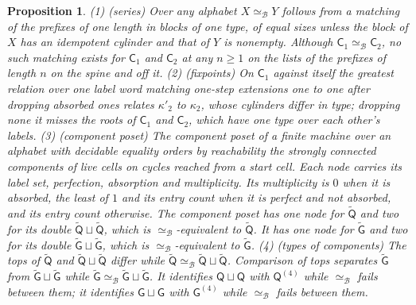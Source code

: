 \documentclass{lmcs}
\newtheorem{proposition}[theorem]{Proposition}
\theoremstyle{definition}
\theoremstyle{remark}
\providecommand{\dsum}{\sqcup}
\providecommand{\wQ}{\mathsf{Q}}
\providecommand{\eqB}{\simeq_{\mathcal{B}}}
\providecommand{\dsum}{\sqcup}
\providecommand{\wG}{\mathsf{G}}
\providecommand{\wGt}{\tilde{\mathsf{G}}}
\providecommand{\wQ}{\mathsf{Q}}
\providecommand{\wQt}{\tilde{\mathsf{Q}}}
\providecommand{\wC}[1]{\mathsf{C}_{#1}}
\begin{document}
\begin{proposition}\label{prop:presentations}
(1) (\emph{series}) Over any alphabet $X\eqB Y$ follows from a matching of the prefixes of one length in blocks of one
type, of equal sizes unless the block of $X$ has an idempotent cylinder and that of $Y$ is
nonempty. Although $\wC{1}\eqB\wC{2}$, no such matching exists for $\wC{1}$ and $\wC{2}$ at
any $n\geq1$ on the lists of the prefixes of length $n$ on the spine and off it.
(2) (\emph{fixpoints}) On $\wC{1}$ against itself the greatest relation over one label word matching one-step extensions one to one
after dropping absorbed ones relates $\kappa'_2$ to $\kappa_2$, whose cylinders differ in type;
dropping none it misses the roots of $\wC{1}$ and $\wC{2}$, which have one type over
each other's labels.
(3) (\emph{component poset}) The \emph{component poset} of a finite machine over an alphabet with decidable equality
orders by reachability the strongly connected components of live cells on cycles reached from a start
cell. Each node carries its label set, perfection, absorption and
multiplicity. Its multiplicity is $0$ when it is absorbed, the least of $1$ and its entry
count when it is perfect and not absorbed, and its entry count otherwise. The component poset
has one node for $\wQt$ and two for its double $\wQt\dsum\wQt$, which
is $\eqB$-equivalent to $\wQt$. It has one node for $\wGt$ and two for its double
$\wGt\dsum\wGt$, which is $\eqB$-equivalent to $\wGt$.
(4) (\emph{types of components}) The tops of $\wQt$ and $\wQt\dsum\wQt$ differ while
$\wQt\eqB\wQt\dsum\wQt$. Comparison of tops separates $\wGt$ from $\wGt\dsum\wGt$ while $\wGt\eqB\wGt\dsum\wGt$. It identifies
$\wQ\dsum\wQ$ with $\wQ^{(4)}$ while $\eqB$ fails between them; it identifies
$\wG\dsum\wG$ with $\wG^{(4)}$ while $\eqB$ fails between them.
\end{proposition}
\end{document}
